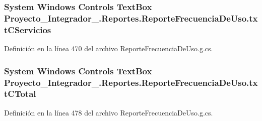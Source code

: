 \hypertarget{class_proyecto___integrador__3_1_1_reportes_1_1_reporte_frecuencia_de_uso_a9abdaf17fc6ada9d897e36cf81413c23}{
\subsubsection[{txt\-C\-Servicios}]{\setlength{\rightskip}{0pt plus 5cm}System Windows Controls Text\-Box Proyecto\-\_\-\-Integrador\-\_.\-Reportes.\-Reporte\-Frecuencia\-De\-Uso.\-txt\-C\-Servicios\hspace{0.3cm}{\ttfamily [package]}}}\label{class_proyecto___integrador__3_1_1_reportes_1_1_reporte_frecuencia_de_uso_a9abdaf17fc6ada9d897e36cf81413c23}


Definición en la línea 470 del archivo Reporte\-Frecuencia\-De\-Uso.\-g.\-cs.

\hypertarget{class_proyecto___integrador__3_1_1_reportes_1_1_reporte_frecuencia_de_uso_abaf1d4ad66a8f620177fc6049ffddcbc}{
\subsubsection[{txt\-C\-Total}]{\setlength{\rightskip}{0pt plus 5cm}System Windows Controls Text\-Box Proyecto\-\_\-\-Integrador\-\_.\-Reportes.\-Reporte\-Frecuencia\-De\-Uso.\-txt\-C\-Total\hspace{0.3cm}{\ttfamily [package]}}}\label{class_proyecto___integrador__3_1_1_reportes_1_1_reporte_frecuencia_de_uso_abaf1d4ad66a8f620177fc6049ffddcbc}


Definición en la línea 478 del archivo Reporte\-Frecuencia\-De\-Uso.\-g.\-cs.


